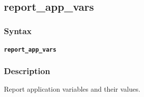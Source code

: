 \pagebreak
\subsection*{report_app_vars}
\subsubsection*{Syntax}
\texttt{\textbf{report_app_vars}}\newline
\subsubsection*{Description}
Report application variables and their values.